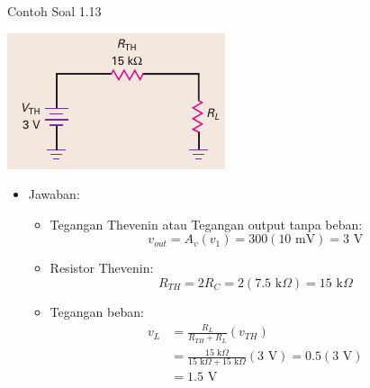 \documentclass[aspectratio=169]{beamer}
\begin{document}
\begin{frame}{Contoh Soal 1.13}
	\begin{multicols}{2}
		\begin{center}
			\includegraphics[height=0.4\textheight]{gambar/01.fig32b}
		\end{center}
		
		\begin{itemize}
			\item Jawaban:
			\begin{itemize}
				\item Tegangan Thevenin atau Tegangan output tanpa beban:
				\[ v_{out} = A_v(v_1) = 300 (10 \text{ mV}) = 3 \text{ V} \]
				\item Resistor Thevenin:
				\[ R_{TH} = 2R_C = 2(7.5 \text{ k}\Omega) = 15 \text{ k}\Omega \]
				\item Tegangan beban:
				\begin{align*}
					v_L &= \frac{R_L}{R_{TH} + R_L}(v_{TH}) \\
					&= \frac{15 \text{ k}\Omega}{15 \text{ k}\Omega + 15 \text{ k}\Omega}(3 \text{ V}) = 0.5(3 \text{ V}) \\
					&= 1.5 \text{ V}
				\end{align*}
			\end{itemize}
		\end{itemize}
		\vfill\null
	\end{multicols}
\end{frame}
\end{document}
